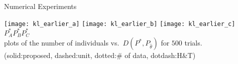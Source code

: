 \documentclass[fleqn,aspectratio=1610]{beamer}
\begin{document}
\begin{frame}[label={sec:org65ffb58}]{Numerical Experiments}
\begin{center}
  \texttt{[image: kl\_earlier\_a]}
  \texttt{[image: kl\_earlier\_b]}
  \texttt{[image: kl\_earlier\_c]}
  \\
  \hspace{.07\textwidth}\(P^*_A\)\hspace{.27\textwidth}\(P^*_B\)\hspace{.27\textwidth}\(P^*_C\)
  \\[4pt]
  plots of the number of individuals vs.\ \(D(P^*,P_{\hat\theta})\) for \(500\) trials.
  \\
  (solid:proposed, dashed:unit, dotted:\# of data,  dotdash:H\&T)
\end{center}
\end{frame}
\end{document}
